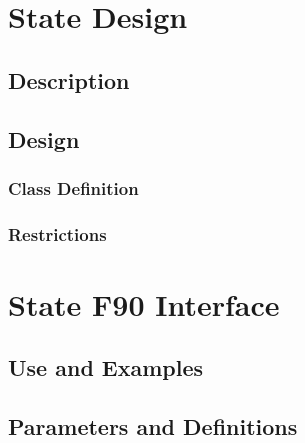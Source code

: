 \documentclass[]{article}
\begin{document}









\section{State Design}

\subsection{Description}




\subsection{Design}




\subsubsection{Class Definition}




\subsubsection{Restrictions}




\section{State F90 Interface}

\subsection{Use and Examples}




\subsection{Parameters and Definitions}


\end{document}
